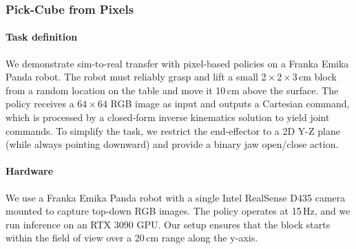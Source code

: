 \begin{table}[!tb]
  \centering
  \caption{\small{Sim-to-real reorientation performance on the Franka Emika Panda robot, evaluated across 35 hardware trials. Each metric is reported as the median and mean (with a 95\% confidence interval). The success rate is bolded to highlight final task performance. The training was done on 16x A100 GPUs.}
  }
  \vspace{-10pt}
  \smallskip
  \vspace{-20pt}
  \label{table:blockreorientfrankarobotiqrealresults}
\end{table}


\subsubsection{Pick-Cube from Pixels}
\label{sec:results_pickcube_pixels}


\paragraph{Task definition}
We demonstrate sim-to-real transfer with pixel-based policies on a Franka Emika Panda robot. The robot must reliably grasp and lift a small 2\,\(\times\)\,2\,\(\times\)\,3\,cm block from a random location on the table and move it 10\,cm above the surface. The policy receives a \(64\times64\) RGB image as input and outputs a Cartesian command, which is processed by a closed-form inverse kinematics solution to yield joint commands. To simplify the task, we restrict the end-effector to a 2D Y-Z plane (while always pointing downward) and provide a binary jaw open/close action.

\paragraph{Hardware}
We use a Franka Emika Panda robot with a single Intel RealSense D435 camera mounted to capture top-down RGB images. The policy operates at 15\,Hz, and we run inference on an RTX 3090 GPU. Our setup ensures that the block starts within the field of view over a 20\,cm range along the y-axis.

